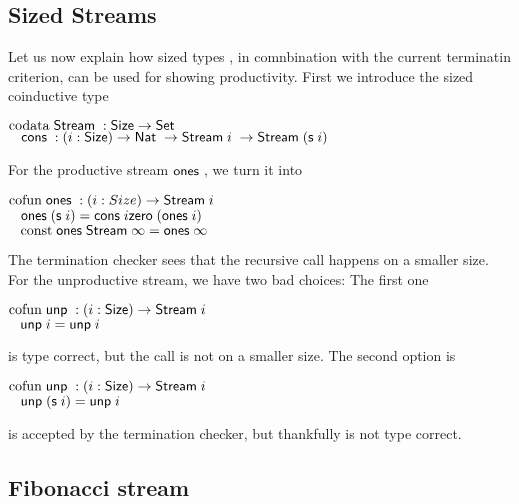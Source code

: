 \subsection{Sized Streams}
Let us now explain how sized types , in comnbination with the current terminatin criterion, can be used for showing productivity.
First we introduce the sized coinductive type 
\begin{bsp}
$\mathrm{codata}\; \mathsf{Stream}\; : \mathsf{Size} \rightarrow \mathsf{Set} $ \\
$\hspace*{3mm} \mathsf{cons}\; : ( i : \mathsf{Size} ) \rightarrow{\mathsf{Nat}\;\rightarrow\mathsf{Stream}\;i \; \rightarrow\mathsf{Stream}\;(\mathsf{s}\;i) } $
\end{bsp}
For the productive stream $\mathsf{ones}\;$, we turn it into
\begin{bsp}
$\mathrm{cofun}\; \mathsf{ones}\;: ( i : Size ) \rightarrow{\mathsf{Stream}\;i} $ \\
$\hspace*{3mm} \mathsf{ones}\; (\mathsf{s}\; i) = \mathsf{cons}\; i \mathsf{zero}\; (\mathsf{ones}\; i)$\\
$\hspace*{3mm} \mathrm{const}\; \mathsf{ones}\; \mathsf{Stream}\; \infty = \mathsf{ones}\; \infty $
\end{bsp}
The termination checker sees that the recursive call happens on a smaller size.
For the unproductive stream, we have two bad choices:
The first one
\begin{bsp}
$\mathrm{cofun}\; \mathsf{unp}\; : ( i : \mathsf{Size} ) \rightarrow{\mathsf{Stream}\;i}$ \\
$\hspace*{3mm} \mathsf{unp}\; i =  \mathsf{unp}\; i$
\end{bsp}
is type correct, but the call is not on a smaller size.
The second option is
\begin{bsp}
$\mathrm{cofun}\; \mathsf{unp}\; : ( i : \mathsf{Size} ) \rightarrow{\mathsf{Stream}\;i}$ \\
$\hspace*{3mm} \mathsf{unp}\; (\mathsf{s}\; i) = \mathsf{unp}\; i $
\end{bsp}
is accepted by the termination checker, but thankfully is not type correct.
\subsection{Fibonacci stream}

